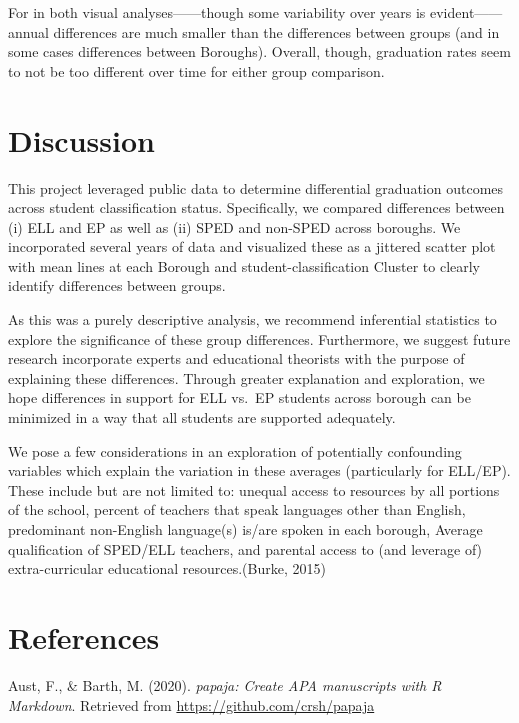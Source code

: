 \documentclass[
  english,
  man, fleqn, noextraspace]{apa6}
\begin{document}
For in both visual analyses------though some variability over years is evident------annual differences are much smaller than the differences between groups (and in some cases differences between Boroughs). Overall, though, graduation rates seem to not be too different over time for either group comparison.

\hypertarget{discussion}{%
\section{Discussion}\label{discussion}}

This project leveraged public data to determine differential graduation outcomes across student classification status. Specifically, we compared differences between (i) ELL and EP as well as (ii) SPED and non-SPED across boroughs. We incorporated several years of data and visualized these as a jittered scatter plot with mean lines at each Borough and student-classification Cluster to clearly identify differences between groups.

As this was a purely descriptive analysis, we recommend inferential statistics to explore the significance of these group differences. Furthermore, we suggest future research incorporate experts and educational theorists with the purpose of explaining these differences. Through greater explanation and exploration, we hope differences in support for ELL vs.~EP students across borough can be minimized in a way that all students are supported adequately.

We pose a few considerations in an exploration of potentially confounding variables which explain the variation in these averages (particularly for ELL/EP). These include but are not limited to: unequal access to resources by all portions of the school, percent of teachers that speak languages other than English, predominant non-English language(s) is/are spoken in each borough, Average qualification of SPED/ELL teachers, and parental access to (and leverage of) extra-curricular educational resources.(Burke, 2015)

\newpage

\hypertarget{references}{%
\section{References}\label{references}}

\begingroup
\setlength{\parindent}{-0.5in}
\setlength{\leftskip}{0.5in}

\hypertarget{refs}{}
\leavevmode\hypertarget{ref-R-papaja}{}%
Aust, F., \& Barth, M. (2020). \emph{papaja: Create APA manuscripts with R Markdown}. Retrieved from \url{https://github.com/crsh/papaja}
\end{document}
